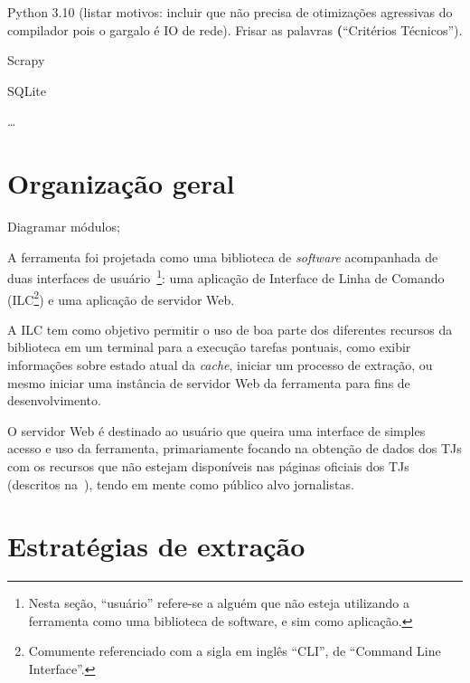 \begin{todolist}
    \item Python 3.10 (listar motivos: incluir que não precisa de otimizações
        agressivas do compilador pois o gargalo é IO de rede). Frisar as
        palavras \textbf(``Critérios Técnicos'').
    \item Scrapy
    \item SQLite
    \item \ldots
\end{todolist}

\section{Organização geral}

\begin{todolist}
    \item Diagramar módulos;
\end{todolist}

A ferramenta foi projetada como uma biblioteca de \textit{software} acompanhada
de duas interfaces de usuário~\footnote{Nesta seção, ``usuário'' refere-se a
alguém que não esteja utilizando a ferramenta como uma biblioteca de software,
e sim como aplicação.}: uma aplicação de Interface de Linha de Comando
(ILC\footnote{Comumente referenciado com a sigla em inglês ``CLI'', de
``Command Line Interface''.}) e uma aplicação de servidor Web.

A ILC tem como objetivo permitir o uso de boa parte dos diferentes recursos da
biblioteca em um terminal para a execução tarefas pontuais, como exibir
informações sobre estado atual da \textit{cache}, iniciar um processo de
extração, ou mesmo iniciar uma instância de servidor Web da ferramenta para
fins de desenvolvimento.

O servidor Web é destinado ao usuário que queira uma interface de simples
acesso e uso da ferramenta, primariamente focando na obtenção de dados dos TJs
com os recursos que não estejam disponíveis nas páginas oficiais dos TJs
(descritos na~), tendo em mente como público
alvo jornalistas.

\section{Estratégias de extração}

